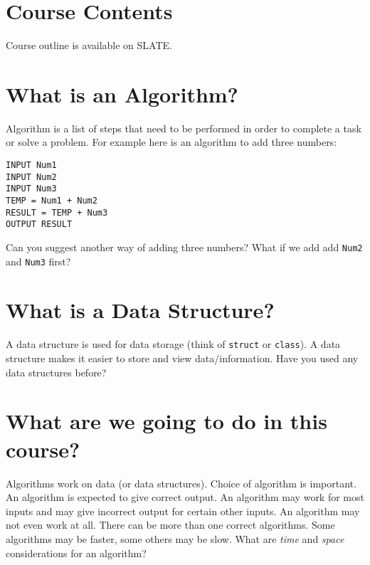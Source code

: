 \documentclass[12pt,a4paper]{article}
\begin{document}
\section{Course Contents}
Course outline is available on SLATE.
\section{What is an Algorithm?}
Algorithm is a list of steps that need to be performed in order to complete a task or solve a problem. For example here is an algorithm to add three numbers:
\begin{lstlisting}[caption={Algorithm to add three numbers}]
INPUT Num1
INPUT Num2
INPUT Num3
TEMP = Num1 + Num2
RESULT = TEMP + Num3
OUTPUT RESULT
\end{lstlisting}
Can you suggest another way of adding three numbers? What if we add add \verb|Num2| and \verb|Num3| first?
\section{What is a Data Structure?}
A data structure is used for data storage (think of \verb|struct| or \verb|class|). A data structure makes it easier to store and view data/information. Have you used any data structures before?
\section{What are we going to do in this course?}
Algorithms work on data (or data structures). Choice of algorithm is important. An algorithm is expected to give correct output. An algorithm may work for most inputs and may give incorrect output for certain other inputs. An algorithm may not even work at all. There can be more than one correct algorithms. Some algorithms may be faster, some others may be slow. What are \textit{time} and \textit{space} considerations for an algorithm?
\end{document}
